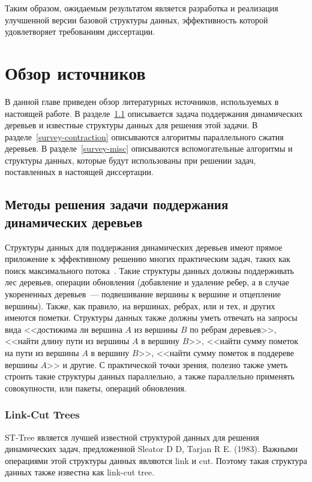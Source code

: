 \documentclass[specification,annotation]{itmo-student-thesis}
\begin{document}
Таким образом, ожидаемым результатом является разработка и реализация улучшенной версии базовой структуры данных, эффективность которой удовлетворяет 
требованиям диссертации.

\chapter{Обзор источников}

В данной главе приведен обзор литературных источников, используемых в настоящей работе. 
В разделе~\ref{survey-tree} описывается задача поддержания динамических деревьев и известные структуры данных для решения этой задачи.
В разделе~\ref{survey-contraction} описываются алгоритмы параллельного сжатия деревьев.
В разделе~\ref{survey-misc} описываются вспомогательные алгоритмы и структуры данных, которые будут использованы при решении задач, поставленных в настоящей диссертации.

\section{Методы решения задачи поддержания динамических деревьев}\label{survey-tree}

Структуры данных для поддержания динамических деревьев имеют прямое приложение к эффективному решению многих практическим задач,
таких как поиск максимального потока~\cite{goldberg88}. Такие структуры данных должны поддерживать лес деревьев,
операции обновления (добавление и удаление ребер, а в случае укорененных деревьев~--- подвешивание вершины к вершине и отцепление вершины).
Также, как правило, на вершинах, ребрах, или и тех, и других имеются пометки. Структуры данных также должны уметь отвечать на запросы
вида <<достижима ли вершина $A$ из вершины $B$ по ребрам деревьев>>, <<найти длину пути из вершины $A$ в вершину $B$>>,
<<найти сумму пометок на пути из вершины $A$ в вершину $B$>>, <<найти сумму пометок в поддереве вершины $A$>> и другие.
С практической точки зрения, полезно также уметь строить такие структуры данных параллельно, а также параллельно применять совокупности, или пакеты, операций обновления.

\subsection{Link-Cut Trees}

ST-Tree является лучшей известной структурой данных для решения динамических задач, предложенной Sleator D D, Tarjan R E. (1983). Важными операциями этой 
структуры данных являются link и cut. Поэтому такая структура данных также известна как link-cut tree.
\end{document}
